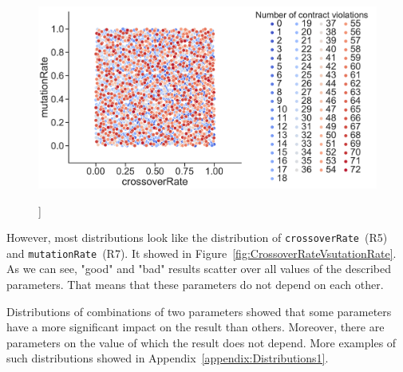 \begin{figure}
	\centering
	\includegraphics[width=\textwidth]{images/CrossoverRateVsutationRate.pdf}
	\caption[]]{}
	\label{fig:CrossoverRateVmutationRate}
\end{figure}

However, most distributions look like the distribution of \texttt{crossoverRate}~(R5) and \texttt{mutationRate}~(R7). It showed in Figure~\ref{fig:CrossoverRateVsutationRate}. As we can see, "good" and "bad" results scatter over all values of the described parameters. That means that these parameters do not depend on each other.

Distributions of combinations of two parameters showed that some parameters have a more significant impact on the result than others. Moreover, there are parameters on the value of which the result does not depend. More examples of such distributions showed in Appendix~\ref{appendix:Distributions1}.

